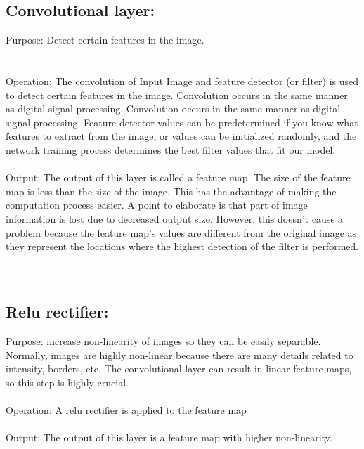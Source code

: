 \documentclass[12pt,letterpaper, onecolumn]{exam}
\begin{document}
    \subsection{Convolutional layer:}
    Purpose: Detect certain features in the image.\\\\\\

  Operation: The convolution of Input Image and feature detector (or filter) is used to detect certain features in the image. Convolution occurs in the same manner as digital      signal processing. Convolution occurs in the same manner as digital signal processing. Feature detector values can be predetermined if you know what features to extract from   the image, or values can be initialized randomly, and the network training process determines the best filter values that fit our model.
\\\\
  Output: The output of this layer is called a feature map. The size of the feature map is less than the size of the image. This has the advantage of making the computation        process easier. A point to elaborate is that part of image information is lost due to decreased output size. However, this doesn’t cause a problem because the feature map’s      values are different from the original image as they represent the locations where the highest detection of the filter is performed.\\\\\\
    
    \subsection{Relu rectifier:}
    Purpose: increase non-linearity of images so they can be easily separable. Normally, images are highly non-linear because there are many details related to intensity, borders,   etc. The convolutional layer can result in linear feature maps, so this step is highly crucial.\\\\

  Operation: A relu rectifier is applied to the feature map
\\\\
  Output: The output of this layer is a feature map with higher non-linearity.\\\\\\
\end{document}
